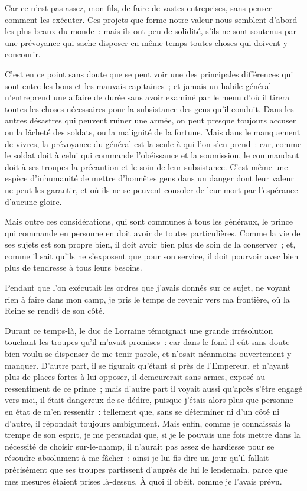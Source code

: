 \documentclass[french,twoside]{book} %
\begin{document}
Car ce n’est pas assez, mon fils, de faire de vastes entreprises, sans penser comment les exécuter. Ces projets que forme notre valeur nous semblent d’abord les plus beaux du monde : mais ils ont peu de solidité, s’ils ne sont soutenus par une prévoyance qui sache disposer en même temps toutes choses qui doivent y concourir.\par
C’est en ce point sans doute que se peut voir une des principales différences qui sont entre les bons et les mauvais capitaines ; et jamais un habile général n’entreprend une affaire de durée sans avoir examiné par le menu d’où il tirera toutes les choses nécessaires pour la subsistance des gens qu’il conduit. Dans les autres désastres qui peuvent ruiner une armée, on peut presque toujours accuser ou la lâcheté des soldats, ou la malignité de la fortune. Mais dans le manquement de vivres, la prévoyance du général est la seule à qui l’on s’en prend : car, comme le soldat doit à celui qui commande l’obéissance et la soumission, le commandant doit à ses troupes la précaution et le soin de leur subsistance. C’est même une espèce d’inhumanité de mettre d’honnêtes gens dans un danger dont leur valeur ne peut les garantir, et où ils ne se peuvent consoler de leur mort par l’espérance d’aucune gloire.\par
Mais outre ces considérations, qui sont communes à tous les généraux, le prince qui commande en personne en doit avoir de toutes particulières. Comme la vie de ses sujets est son propre bien, il doit avoir bien plus de soin de la conserver ; et, comme il sait qu’ils ne s’exposent que pour son service, il doit pourvoir avec bien plus de tendresse à tous leurs besoins.\par
Pendant que l’on exécutait les ordres que j’avais donnés sur ce sujet, ne voyant rien à faire dans mon camp, je pris le temps de revenir vers ma frontière, où la Reine se rendit de son côté.\par
Durant ce temps-là, le duc de Lorraine témoignait une grande irrésolution touchant les troupes qu’il m’avait promises : car dans le fond il eût sans doute bien voulu se dispenser de me tenir parole, et n’osait néanmoins ouvertement y manquer. D’autre part, il se figurait qu’étant si près de l’Empereur, et n’ayant plus de places fortes à lui opposer, il demeurerait sans armes, exposé au ressentiment de ce prince ; mais d’autre part il voyait aussi qu’après s’être engagé vers moi, il était dangereux de se dédire, puisque j’étais alors plus que personne en état de m’en ressentir : tellement que, sans se déterminer ni d’un côté ni d’autre, il répondait toujours ambigument. Mais enfin, comme je connaissais la trempe de son esprit, je me persuadai que, si je le pouvais une fois mettre dans la nécessité de choisir sur-le-champ, il n’aurait pas assez de hardiesse pour se résoudre absolument à me fâcher : ainsi je lui fis dire un jour qu’il fallait précisément que ses troupes partissent d’auprès de lui le lendemain, parce que mes mesures étaient prises là-dessus. À quoi il obéit, comme je l’avais prévu.\par
\end{document}
